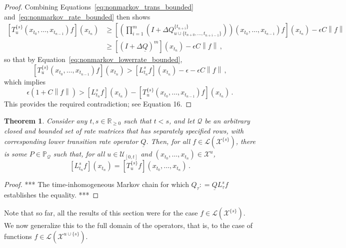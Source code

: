 \documentclass[10pt]{paper}
\newtheorem{theorem}{Theorem}
\newcommand{\reals}{\mathbb{R}}
\newcommand{\realsnonneg}{\reals_{\geq 0}}
\newcommand{\states}{\mathcal{X}}
\newcommand{\gambles}{\mathcal{L}}
\newcommand{\lrate}{\underline{Q}}
\newcommand{\norm}[1]{\left\lVert #1 \right\rVert}
\newcommand{\coloneqq}{:\!=}
\begin{document}
\begin{proof}
Combining Equations~\eqref{eq:nonmarkov_trans_bounded} and~\eqref{eq:nonmarkov_rate_bounded} then shows
\begin{align*}
\left[T_u^{\{s\}}(x_{t_0},\ldots,x_{t_{n-1}})f\right](x_{t_n}) &\geq \left[\left(\prod_{i=1}^m\left(I + \Delta Q_{u\cup\{t_{n+0},\ldots,t_{n+i-1}\}}^{\{t_{n+i}\}}\right)\right)(x_{t_0},\ldots,x_{t_{n-1}})f\right](x_{t_n}) - \epsilon C\norm{f} \\
&\geq \left[\left(I+\Delta\lrate\right)^m\right](x_{t_n}) - \epsilon C\norm{f}\,,
\end{align*}
so that by Equation~\eqref{eq:nonmarkov_lowerrate_bounded},
\begin{equation*}
\left[T_u^{\{s\}}(x_{t_0},\ldots,x_{t_{n-1}})f\right](x_{t_n}) > \left[L_{t_n}^sf\right](x_{t_n}) - \epsilon -\epsilon C\norm{f}\,,
\end{equation*}
which implies
\begin{equation*}
\epsilon(1 + C\norm{f}) > \left[L_{t_n}^sf\right](x_{t_n}) - \left[T_u^{\{s\}}(x_{t_0},\ldots,x_{t_{n-1}})f\right](x_{t_n})\,.
\end{equation*}
This provides the required contradiction; see Equation 16.
\end{proof}

\begin{theorem}\label{theorem:nonmarkov_single_variable_lower_envelope}
Consider any $t,s\in\realsnonneg$ such that $t<s$, and let $\mathcal{Q}$ be an arbitrary closed and bounded set of rate matrices that has separately specified rows, with corresponding lower transition rate operator $\lrate$. Then, for all $f\in\gambles(\states^{\{s\}})$, there is some $P\in\mathbb{P}_\mathcal{Q}$ such that, for all $u\in\mathcal{U}_{[0,t]}$ and $(x_{t_0},\ldots,x_{t_n})\in\states^u$,
\begin{equation*}
\left[L_{t_n}^{s}f\right](x_{t_n}) = \left[T_{u}^{\{s\}}f\right](x_{t_0},\ldots,x_{t_n})\,.
\end{equation*}
\end{theorem}
\begin{proof}
*** The time-inhomogeneous Markov chain for which $Q_{\tau}\coloneqq \lrate L_{\tau}^sf$ establishes the equality. ***
\end{proof}

Note that so far, all the results of this section were for the case $f\in\gambles(\states^{\{s\}})$. We now generalize this to the full domain of the operators, that is, to the case of functions $f\in\gambles(\states^{u\cup\{s\}})$.
\end{document}
